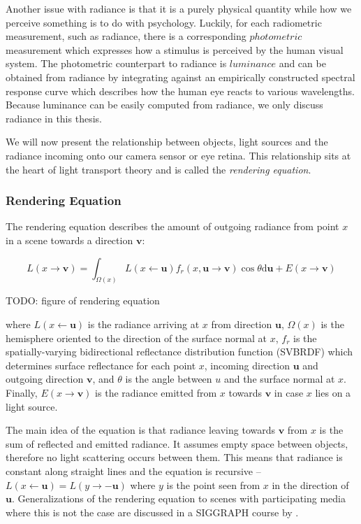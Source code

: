 Another issue with radiance is that it is a purely physical quantity while how we perceive something is to do with psychology. Luckily, for each radiometric measurement, such as radiance, there is a corresponding \(photometric\) measurement which expresses how a stimulus is perceived by the human visual system. The photometric counterpart to radiance is \(luminance\) and can be obtained from radiance by integrating against an empirically constructed spectral response curve which describes how the human eye reacts to various wavelengths. Because luminance can be easily computed from radiance, we only discuss radiance in this thesis.

We will now present the relationship between objects, light sources and the radiance incoming onto our camera sensor or eye retina. This relationship sits at the heart of light transport theory and is called the \textit{rendering equation}.

\subsubsection{Rendering Equation}
\label{section:background-projection_mapping-light_transport-rendering_equation}

The rendering equation describes the amount of outgoing radiance from point \(x\) in a scene towards a direction \(\mathbf{v}\):

\begin{equation}
    \label{eq:rendering_equation}
    L(x \rightarrow \mathbf{v}) = \int_{\Omega(x)} L(x \leftarrow \mathbf{u}) f_r(x, \mathbf{u} \rightarrow \mathbf{v}) \cos \theta \mathrm{d}\mathbf{u} + E(x \rightarrow \mathbf{v})
\end{equation}

{\color{red} TODO: figure of rendering equation}

where \(L(x \leftarrow \mathbf{u})\) is the radiance arriving at \(x\) from direction \(\mathbf{u}\), \(\Omega(x)\) is the hemisphere oriented to the direction of the surface normal at \(x\), \(f_r\) is the spatially-varying bidirectional reflectance distribution function (SVBRDF) which determines surface reflectance for each point \(x\), incoming direction \(\mathbf{u}\) and outgoing direction \(\mathbf{v}\), and \(\theta\) is the angle between \(u\) and the surface normal at \(x\). Finally, \(E(x \rightarrow \mathbf{v})\) is the radiance emitted from \(x\) towards \(\mathbf{v}\) in case \(x\) lies on a light source.

The main idea of the equation is that radiance leaving towards \(\mathbf{v}\) from \(x\) is the sum of reflected and emitted radiance. It assumes empty space between objects, therefore no light scattering occurs between them. This means that radiance is constant along straight lines and the equation is recursive -- \(L(x \leftarrow \mathbf{u}) = L(y \rightarrow -\mathbf{u})\) where \(y\) is the point seen from \(x\) in the direction of \(\mathbf{u}\). Generalizations of the rendering equation to scenes with participating media where this is not the case are discussed in a SIGGRAPH course by \citet{Novak2018}.

